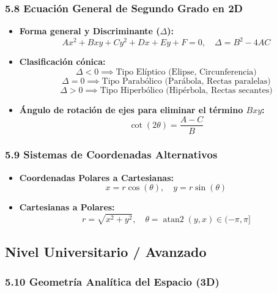 \documentclass[11pt,a4paper]{article}
\begin{document}
\subsubsection*{5.8 Ecuación General de Segundo Grado en 2D}

\begin{itemize}
  \item \textbf{Forma general y Discriminante ($\Delta$):}
  \[
    Ax^2 + Bxy + Cy^2 + Dx + Ey + F = 0, \quad \Delta = B^2 - 4AC
  \]
  \item \textbf{Clasificación cónica:}
  \[
    \Delta < 0 \implies \text{Tipo Elíptico (Elipse, Circunferencia)}
  \]
  \[
    \Delta = 0 \implies \text{Tipo Parabólico (Parábola, Rectas paralelas)}
  \]
  \[
    \Delta > 0 \implies \text{Tipo Hiperbólico (Hipérbola, Rectas secantes)}
  \]
  \item \textbf{Ángulo de rotación de ejes para eliminar el término $Bxy$:}
  \[
    \cot(2\theta) = \frac{A - C}{B}
  \]
\end{itemize}

\subsubsection*{5.9 Sistemas de Coordenadas Alternativos}

\begin{itemize}
  \item \textbf{Coordenadas Polares a Cartesianas:}
  \[
    x = r\cos(\theta), \quad y = r\sin(\theta)
  \]
  \item \textbf{Cartesianas a Polares:}
  \[
    r = \sqrt{x^2 + y^2}, \quad \theta = \operatorname{atan2}(y, x) \in (-\pi, \pi]
  \]
\end{itemize}

\subsection*{Nivel Universitario / Avanzado}

\subsubsection*{5.10 Geometría Analítica del Espacio (3D)}
\end{document}
